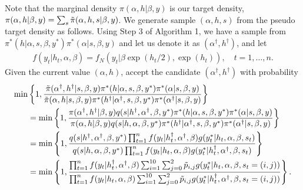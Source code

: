 \noindent
Note that the marginal density $\pi(\alpha,h|\beta,y)$ is our target density, $\pi(\alpha,h|\beta,y) = \sum_s \Tilde{\pi}(\alpha,h,s|\beta,y)$. We generate sample $(\alpha, h, s)$ from the pseudo target density as follows. Using Step 3 of Algorithm 1, we have a sample from $\pi^*(h|\alpha, s,\beta, y^*)\pi^*(\alpha|s,\beta,y)$ and let us denote it as $(\alpha^\dagger,h^\dag)$, and let
    \begin{align*}
        f(y_t|h_t, \alpha, \beta) = f_N(y_t| \beta \exp(h_t/2), \exp(h_t)), 
        \quad t=1,\ldots,n.
    \end{align*}
Given the current value $(\alpha,h)$, accept the candidate $(\alpha^\dagger,h^\dag)$ with probability
    \begin{align*}
        \min &\left\{ 1, \frac{\Tilde{\pi}(\alpha^\dag, h^\dag| s, \beta, y)\pi^*(h|\alpha, s, \beta,y ^*)\pi^*(\alpha|s,\beta,y)}{\Tilde{\pi}(\alpha, h|s, \beta,y)\pi^*(h^\dag|\alpha^{\dagger}, s, \beta, y^*)\pi^*(\alpha^{\dagger}|s,\beta,y)} \right\} \\
        &= \min \left\{ 1, \frac{\pi(\alpha^\dag, h^\dag| \beta,y) q(s|h^\dag,\alpha^\dag,\beta, y^*) \pi^*(h|\alpha, s,\beta, y^*)\pi^*(\alpha|s,\beta,y)}{\pi(\alpha,h|\beta,y) q(s|h,\alpha,\beta, y^*) \pi^*(h^\dag|\alpha^{\dagger}, s, \beta, y^*)\pi^*(\alpha^{\dagger}|s,\beta,y)} \right\} \\
        &= \min \left\{ 1, \frac{q(s|h^\dag,\alpha^\dag,\beta, y^*) \prod_{t=1}^n f(y_t| h_t^\dag, \alpha^\dag,\beta) g(y_t^*| h_t, \alpha,\beta, s_t) }{q(s|h,\alpha,\beta, y^*)\prod_{t=1}^n f(y_t| h_t, \alpha,\beta) g(y_t^*| h_t^\dag, \alpha^\dag,\beta, s_t) } \right\} \\
        &= \min \left\{ 1, \frac{\prod_{t=1}^n f(y_t| h_t^\dag, \alpha^\dag,\beta) \sum_{i=1}^{10}\sum_{j=0}^2 \Tilde{p}_{i,j} g(y_t^*| h_t, \alpha,\beta, s_t=(i,j)) }{\prod_{t=1}^n f(y_t| h_t, \alpha,\beta) \sum_{i=1}^{10}\sum_{j=0}^2 \Tilde{p}_{i,j} g(y_t^*| h_t^\dag, \alpha^\dag,\beta, s_t=(i,j)) } \right\}.
       \end{align*}
    \vspace{2mm}

